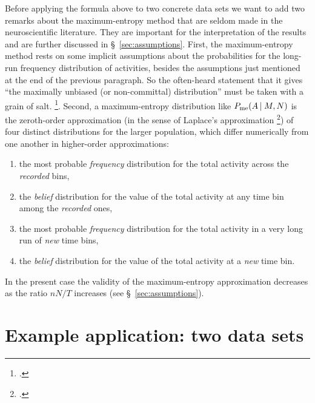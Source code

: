 \documentclass[\ifafour a4paper,12pt,\else a5paper,10pt,\fi%
onecolumn,oneside,article,%
british%
]{memoir}
\theoremstyle{remark}
\theoremstyle{innote}
\newcommand*{\citep}{\footcites}
\renewcommand*{\le}{\leqslant}%
\renewcommand*{\|}{\nonscript\,\vert\nonscript\;\mathopen{}}
\newcommand*{\sect}{\S}%
\newcommand*{\chap}{ch.}%
\newcommand*{\puzzle}{{\fontencoding{U}\fontfamily{fontawesometwo}\selectfont\symbol{225}}}
\newcommand{\mynote}[1]{ {\color{notecolour}\puzzle\ #1}}
\newcommand*{\yAv}{A}
\newcommand*{\yFF}{F}
\newcommand*{\yA}{\yAv}%
\newcommand*{\yH}{\varIota}
\newcommand*{\ynuu}{\nu}
\newcommand*{\px}{P_{\text{me}}}
\begin{document}
Before applying the formula above to two concrete data sets we want to add
two remarks about the maximum-entropy method that are seldom made in the
neuroscientific literature. They are important for the interpretation of
the results and are further discussed in \sect~\ref{sec:assumptions}.
First, the maximum-entropy
method %
rests on some implicit assumptions about the probabilities for the long-run
frequency distribution of activities, besides the assumptions just
mentioned at the end of the previous paragraph. So the often-heard
statement that it gives \enquote{the maximally unbiased (or non-committal)
  distribution} must be taken with a grain of salt. \citep[\mynote{move to
  sect}]{jaynes1986d_r1996,portamana2009,portamana2017}. Second, a
maximum-entropy distribution like $\px(\yA \| M, N)$ is the zeroth-order
approximation (in the sense of Laplace's approximation
\citep[\chap~4]{debruijn1958_r1961}{tierneyetal1986,strawderman2000}) of
four distinct distributions for the larger population, which differ
numerically from one another in higher-order approximations:
\begin{enumerate}[label=(\roman*)]
\item the most probable \emph{frequency} distribution for the total
  activity across the \emph{recorded} bins, %
\item the \emph{belief} distribution for the value of the total
  activity at any time bin among the \emph{recorded} ones,
\item the most probable \emph{frequency} distribution for the total
  activity in a very long run of \emph{new} time bins, %
\item the \emph{belief} distribution for the value of the total
  activity at a \emph{new} time bin.
\end{enumerate}
In the present case the validity of the maximum-entropy approximation
decreases as the ratio $nN/T$ increases (see \sect~\ref{sec:assumptions}).


\section{Example application: two data sets}
\label{sec:application}
\end{document}
